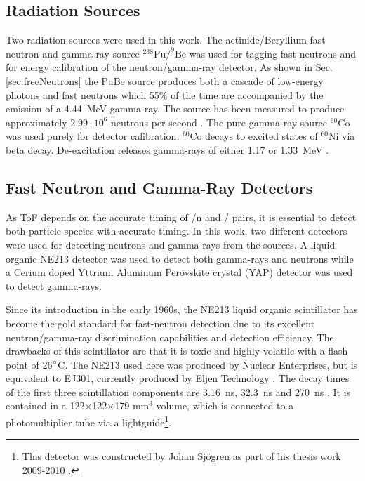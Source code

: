 \documentclass[main.tex]{subfiles}
\begin{document}
\subsection{Radiation Sources}
Two radiation sources were used in this work. The actinide/Beryllium fast neutron and gamma-ray source $^\text{238}\text{Pu}/^\text{9}\text{Be}$ was used for tagging fast neutrons and for energy calibration of the neutron/gamma-ray detector. As shown in Sec. \ref{sec:freeNeutrons} the PuBe source produces both a cascade of low-energy photons and fast neutrons which 55\% of the time are accompanied by the emission of a \SI{4.44}{\MeV} gamma-ray. The source has been measured to produce approximately $\text{2.99}\cdot\text{10}^\text{6}$ neutrons per second \cite{Scherzinger:2017}. The pure gamma-ray source $^\text{60}\text{Co}$ was used purely for detector calibration. $^\text{60}\text{Co}$ decays to excited states of $^\text{60}\text{Ni}$ via beta decay. De-excitation releases gamma-rays of either 1.17 or \SI{1.33}{MeV} \cite{Nudat}.



\subsection{Fast Neutron and Gamma-Ray Detectors}
As ToF depends on the accurate timing of \textgamma /n and \textgamma /\textgamma\; pairs, it is essential to detect both particle species with accurate timing. In this work, two different detectors were used for detecting neutrons and gamma-rays from the sources. A liquid organic NE213 detector was used to detect both gamma-rays and neutrons while a Cerium doped Yttrium Aluminum Perovskite crystal (YAP) detector was used to detect gamma-rays. 

Since its introduction in the early 1960s, the NE213 liquid organic scintillator has become the gold standard for fast-neutron detection due to its excellent neutron/gamma-ray discrimination capabilities and detection efficiency. 
The drawbacks of this scintillator are that it is toxic and highly volatile with a flash point of 26$\text{\degree}$C. The NE213 used here was produced by Nuclear Enterprises, but is equivalent to EJ301, currently produced by Eljen Technology \cite{Eljen}. The decay times of the first three scintillation components are \SI{3.16}{ns}, \SI{32.3}{ns} and \SI{270}{ns} \cite{Eljen}. It is contained in a 122$\times$122$\times$179 \si{\mm}$^\text{3}$ volume, which is connected to a photomultiplier tube via a lightguide\footnote{This detector was constructed by Johan Sjögren as part of his thesis work 2009-2010 \cite{sjogren}.}.
\end{document}
